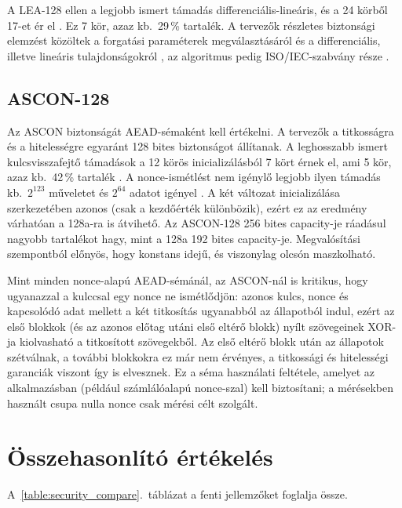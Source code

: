 \documentclass[a4paper,12pt]{report}
\theoremstyle{definition}
\theoremstyle{remark}
\begin{document}
A LEA-128 ellen a legjobb ismert támadás differenciális-lineáris, és a 24 körből 17-et ér el \cite{Chen2023}. Ez 7 kör, azaz kb.\ 29\,\% tartalék. A tervezők részletes biztonsági elemzést közöltek a forgatási paraméterek megválasztásáról és a differenciális, illetve lineáris tulajdonságokról \cite{Hong2013}, az algoritmus pedig ISO/IEC-szabvány része \cite{ISO29192}.

\subsection{ASCON-128}

Az ASCON biztonságát AEAD-sémaként kell értékelni. A tervezők a titkosságra és a hitelességre egyaránt 128 bites biztonságot állítanak. A leghosszabb ismert kulcsvisszafejtő támadások a 12 körös inicializálásból 7 kört érnek el, ami 5 kör, azaz kb.\ 42\,\% tartalék \cite{Dobraunig2021,Rohit2021}. A nonce-ismétlést nem igénylő legjobb ilyen támadás kb.\ $2^{123}$ műveletet és $2^{64}$ adatot igényel \cite{Rohit2021}. A két változat inicializálása szerkezetében azonos (csak a kezdőérték különbözik), ezért ez az eredmény várhatóan a 128a-ra is átvihető. Az ASCON-128 256 bites capacity-je ráadásul nagyobb tartalékot hagy, mint a 128a 192 bites capacity-je. Megvalósítási szempontból előnyös, hogy konstans idejű, és viszonylag olcsón maszkolható.

Mint minden nonce-alapú AEAD-sémánál, az ASCON-nál is kritikus, hogy ugyanazzal a kulccsal egy nonce ne ismétlődjön: azonos kulcs, nonce és kapcsolódó adat mellett a két titkosítás ugyanabból az állapotból indul, ezért az első blokkok (és az azonos előtag utáni első eltérő blokk) nyílt szövegeinek XOR-ja kiolvasható a titkosított szövegekből. Az első eltérő blokk után az állapotok szétválnak, a további blokkokra ez már nem érvényes, a titkossági és hitelességi garanciák viszont így is elvesznek. Ez a séma használati feltétele, amelyet az alkalmazásban (például számlálóalapú nonce-szal) kell biztosítani; a mérésekben használt csupa nulla nonce csak mérési célt szolgált.

\section{Összehasonlító értékelés}\label{sec:security_compare}

A~\ref{table:security_compare}.~táblázat a fenti jellemzőket foglalja össze.
\end{document}
